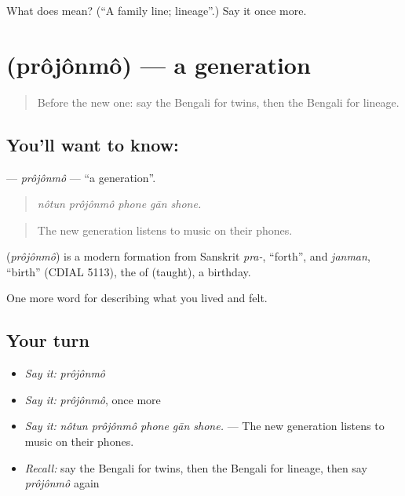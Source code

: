 \begin{tcolorbox}[breakable,colback=teal!4,colframe=teal!35!black,title={Before you move on}]
What does  mean? (\textquotedblleft{}A family line; lineage\textquotedblright{}.) Say it once more.
\end{tcolorbox}
\section[\texorpdfstring{\bn{প্রজন্ম} (prôjônmô)}{প্রজন্ম (prôjônmô)}]{ (prôjônmô) — a generation}

\label{lesson:BN-C484-projonmo}



\begin{quote}
Before the new one: say the Bengali for twins, then the Bengali for lineage.
\end{quote}

\subsection*{You'll want to know: }
\textbf{} — \emph{prôjônmô} — \textquotedblleft{}a generation\textquotedblright{}.

\begin{quote}
    
\end{quote}

\begin{quote}
\emph{nôtun prôjônmô phone gān shone.}
\end{quote}

\begin{quote}
The new generation listens to music on their phones.
\end{quote}

\begin{cousinweb}
\textbf{} (\emph{prôjônmô}) is a modern formation from Sanskrit \emph{pra-}, \textquotedblleft{}forth\textquotedblright{}, and \emph{janman}, \textquotedblleft{}birth\textquotedblright{} (CDIAL 5113), the  of  (taught), a birthday.
\end{cousinweb}

\begin{grammarlens}[title={What you've built}]
One more word for describing what you lived and felt.
\end{grammarlens}

\subsection*{Your turn}
\begin{itemize}
\raggedright
  \item \emph{Say it:} \emph{prôjônmô}
  \item \emph{Say it:} \emph{prôjônmô}, once more
  \item \emph{Say it:} \emph{nôtun prôjônmô phone gān shone.} — The new generation listens to music on their phones.
  \item \emph{Recall:} say the Bengali for twins, then the Bengali for lineage, then say \emph{prôjônmô} again
\end{itemize}

